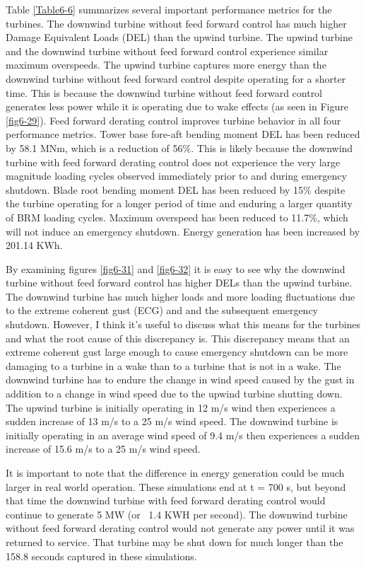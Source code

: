 Table \ref{Table6-6} summarizes several important performance metrics for the turbines. The downwind turbine without feed forward control has much higher Damage Equivalent Loads (DEL) than the upwind turbine. The upwind turbine and the downwind turbine without feed forward control experience similar maximum overspeeds. The upwind turbine captures more energy than the downwind turbine without feed forward control despite operating for a shorter time. This is because the downwind turbine without feed forward control generates less power while it is operating due to wake effects (as seen in Figure \ref{fig6-29}). Feed forward derating control improves turbine behavior in all four performance metrics. Tower base fore-aft bending moment DEL has been reduced by 58.1 MNm, which is a reduction of 56\%. This is likely because the downwind turbine with feed forward derating control does not experience the very large magnitude loading cycles observed immediately prior to and during emergency shutdown. Blade root bending moment DEL has been reduced by 15\% despite the turbine operating for a longer period of time and enduring a larger quantity of BRM loading cycles. Maximum overspeed has been reduced to 11.7\%, which will not induce an emergency shutdown. Energy generation has been increased by 201.14 KWh.


By examining figures \ref{fig6-31} and \ref{fig6-32} it is easy to see why the downwind turbine without feed forward control has higher DELs than the upwind turbine. The downwind turbine has much higher loads and more loading fluctuations due to the extreme coherent gust (ECG) and and the subsequent emergency shutdown. However, I think it's useful to discuss what this means for the turbines and what the root cause of this discrepancy is. This discrepancy means that an extreme coherent gust large enough to cause emergency shutdown can be more damaging to a turbine in a wake than to a turbine that is not in a wake. The downwind turbine has to endure the change in wind speed caused by the gust in addition to a change in wind speed due to the upwind turbine shutting down. The upwind turbine is initially operating in 12 m/s wind then experiences a sudden increase of 13 m/s to a 25 m/s wind speed. The downwind turbine is initially operating in an average wind speed of 9.4 m/s then experiences a sudden increase of 15.6 m/s to a 25 m/s wind speed.

It is important to note that the difference in energy generation could be much larger in real world operation. These simulations end at t = 700 s, but beyond that time the downwind turbine with feed forward derating control would continue to generate 5 MW (or ~1.4 KWH per second). The downwind turbine without feed forward derating control would not generate any power until it was returned to service. That turbine may be shut down for much longer than the 158.8 seconds captured in these simulations.


